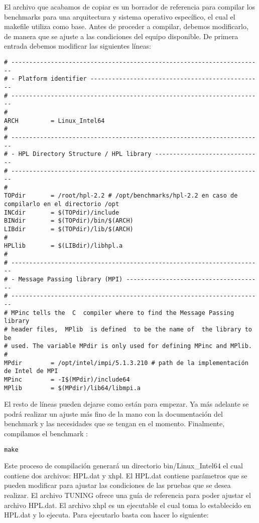 El archivo que acabamos de copiar es un borrador de referencia para compilar los benchmarks para una arquitectura y sistema operativo específico, el cual el makefile utiliza como base. Antes de proceder a compilar, debemos modificarlo, de manera que se ajuste a las condiciones del equipo disponible. De primera entrada debemos modificar las siguientes líneas:

\begin{lstlisting}
# ----------------------------------------------------------------------
# - Platform identifier ------------------------------------------------
# ----------------------------------------------------------------------
#
ARCH         = Linux_Intel64
#
# ----------------------------------------------------------------------
# - HPL Directory Structure / HPL library ------------------------------
# ----------------------------------------------------------------------
#
TOPdir       = /root/hpl-2.2 # /opt/benchmarks/hpl-2.2 en caso de compilarlo en el directorio /opt
INCdir       = $(TOPdir)/include
BINdir       = $(TOPdir)/bin/$(ARCH)
LIBdir       = $(TOPdir)/lib/$(ARCH)
#
HPLlib       = $(LIBdir)/libhpl.a 
#
# ----------------------------------------------------------------------
# - Message Passing library (MPI) --------------------------------------
# ----------------------------------------------------------------------
# MPinc tells the  C  compiler where to find the Message Passing library
# header files,  MPlib  is defined  to be the name of  the library to be
# used. The variable MPdir is only used for defining MPinc and MPlib.
#
MPdir        = /opt/intel/impi/5.1.3.210 # path de la implementación de Intel de MPI
MPinc        = -I$(MPdir)/include64
MPlib        = $(MPdir)/lib64/libmpi.a

\end{lstlisting}

El resto de líneas pueden dejarse como están para empezar. Ya más adelante se podrá realizar un ajuste más fino de la mano con la documentación del benchmark y las necesidades que se tengan en el momento. Finalmente, compilamos el benchmark \cite{linpack01}:

\begin{lstlisting}
make
\end{lstlisting}

Este proceso de compilación generará un directorio bin/Linux\_Intel64 el cual contiene dos archivos: HPL.dat y xhpl. El HPL.dat contiene parámetros que se pueden modificar para ajustar las condiciones de las pruebas que se desea realizar. El archivo TUNING ofrece una guía de referencia para poder ajustar el archivo HPL.dat. El archivo xhpl es un ejecutable el cual toma lo establecido en HPL.dat y lo ejecuta. Para ejecutarlo basta con hacer lo siguiente:

